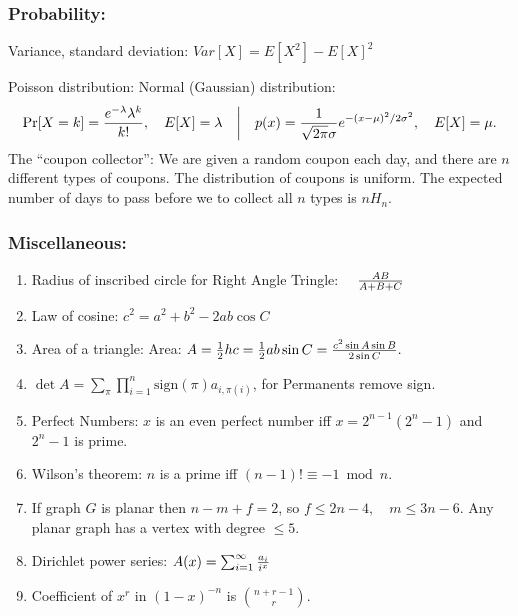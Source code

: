 \documentclass[12pt]{extarticle}
\begin{document}
\begin{multicols*}{2}
			\subsubsection*{Probability:}
			Variance, standard deviation:
			$Var[X] = E[X^2] - E[X]^2$
			\par\vskip 2pt
			\hspace{1cm} Poisson distribution: \hspace{2cm} Normal (Gaussian) distribution:
			$$
			\Pr[X = k] = {e^{-\lambda} \lambda^k \over k!}, \quad  E[X] = \lambda \quad \bigg| \quad p(x) = {1 \over \sqrt{2 \pi} \sigma} e^{-(x-\mu)^2/2\sigma^2}, \quad E[X] = \mu.
			$$
			The ``coupon collector'':
			We are given a random coupon each day,
			and there are $n$ different types of coupons.
			The distribution of coupons is uniform.
			The expected number of days to pass before we to collect all $n$ types is $n H_n.$
			\par\vskip 2pt
			\subsubsection*{Miscellaneous:}
			\begin{enumerate}
				\itemsep0em 
				\item 			Radius of inscribed circle for Right Angle Tringle:
				$\quad {A B \over A + B + C}$
				\item Law of cosine: 			$c^2 = a^2 + b^2 - 2ab \cos C$
				\item Area of a triangle: Area:
				$A = \frac{1}{2} h c
					= \frac{1}{2} a b \sin C
					= {c^2 \sin A \sin B \over 2 \sin C}.$
				\item 			$\det A = \sum_\pi \prod_{i=1}^n \text{sign}(\pi) a_{i,\pi(i)}$, 
				for Permanents remove sign.
				\item Perfect Numbers: $x$ is an even perfect number iff $x = 2^{n-1}(2^n - 1)$ and $2^n - 1$ is prime.
				\item Wilson's theorem: $n$ is a prime iff
				$(n-1)! \equiv -1 \bmod n.$
				\item If graph $G$ is planar then $n - m + f = 2$, so
				$f \leq 2n - 4, \quad m \leq 3 n - 6.$
				Any planar graph has a vertex with degree $\leq 5$.
				\item Dirichlet power series:
				$A(x) =\sum_{i=1}^\infty{a_i \over i^x}$
				\item Coefficient of $x^r$ in $(1-x)^{-n}$ is ${n+r-1}\choose{r}$.
			\end{enumerate}

\end{multicols*}
\end{document}

